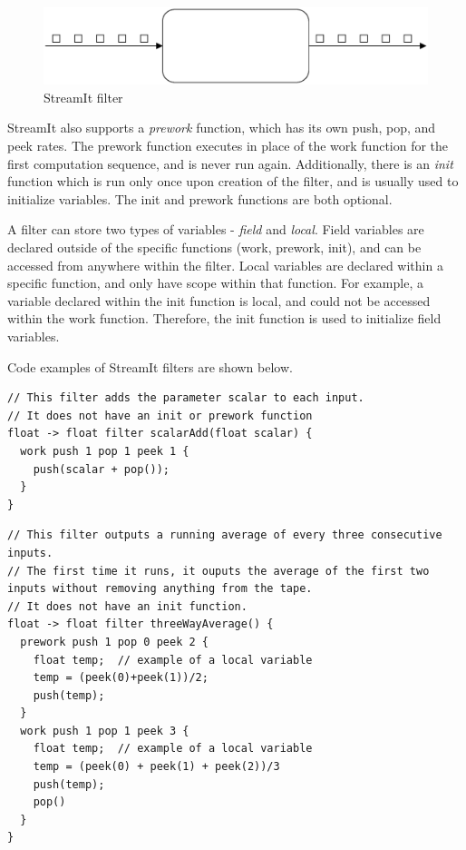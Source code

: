 \begin{figure}[bthp]
  \centering
  \includegraphics[width=6.0in]{figures/filter.eps}
  \caption{StreamIt filter}
  \label{fig:filter}
\end{figure}

    StreamIt also supports a \textit{prework} function, which has its own push,
pop, and peek rates.  The prework function executes in place of
the work function for the first computation sequence, and is never
run again. Additionally, there is an \textit{init} function which
is run only once upon creation of the filter, and is usually used
to initialize variables.  The init and prework functions are both
optional.

        A filter can store two types of variables - \textit{field} and
\textit{local}. Field variables are declared outside of the
specific functions (work, prework, init), and can be accessed from
anywhere within the filter. Local variables are declared within a
specific function, and only have scope within that function. For
example, a variable declared within the init function is local,
and could not be accessed within the work function. Therefore, the
init function is used to initialize field variables.

Code examples of StreamIt filters are shown below.

\begin{scriptsize}
\begin{verbatim}
// This filter adds the parameter scalar to each input.
// It does not have an init or prework function
float -> float filter scalarAdd(float scalar) {
  work push 1 pop 1 peek 1 {
    push(scalar + pop());
  }
}
\end{verbatim}
\end{scriptsize}

\begin{scriptsize}
\begin{verbatim}
// This filter outputs a running average of every three consecutive inputs.
// The first time it runs, it ouputs the average of the first two inputs without removing anything from the tape.
// It does not have an init function.
float -> float filter threeWayAverage() {
  prework push 1 pop 0 peek 2 {
    float temp;  // example of a local variable
    temp = (peek(0)+peek(1))/2;
    push(temp);
  }
  work push 1 pop 1 peek 3 {
    float temp;  // example of a local variable
    temp = (peek(0) + peek(1) + peek(2))/3
    push(temp);
    pop()
  }
}
\end{verbatim}
\end{scriptsize}

